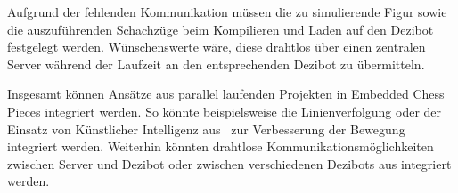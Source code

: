 
Aufgrund der fehlenden Kommunikation müssen die zu simulierende Figur sowie die auszuführenden Schachzüge beim Kompilieren und Laden auf den Dezibot festgelegt werden. Wünschenswerte wäre, diese drahtlos über einen zentralen Server während der Laufzeit an den entsprechenden Dezibot zu übermitteln.


Insgesamt können Ansätze aus parallel laufenden Projekten in Embedded Chess Pieces integriert werden. So könnte beispielsweise die Linienverfolgung oder der Einsatz von Künstlicher Intelligenz aus~\cite{antonovSnskorpion2DezibotLabyrinthSolver2025} zur Verbesserung der Bewegung integriert werden. Weiterhin könnten drahtlose Kommunikationsmöglichkeiten zwischen Server und Dezibot oder zwischen verschiedenen Dezibots aus \mbox{\cite{bruderMoseschmiedelDezibot2025,dietrichTimDietrichDezibotlogging2025,richterCurvesHubDezibotDebugInterface2025}} integriert werden.
